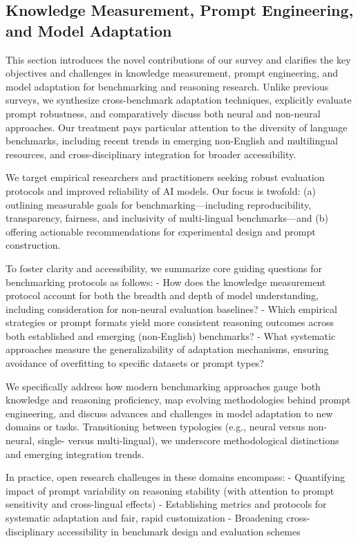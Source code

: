 \documentclass[sigconf]{acmart}
\begin{document}
\subsection{Knowledge Measurement, Prompt Engineering, and Model Adaptation}

This section introduces the novel contributions of our survey and clarifies the key objectives and challenges in knowledge measurement, prompt engineering, and model adaptation for benchmarking and reasoning research. Unlike previous surveys, we synthesize cross-benchmark adaptation techniques, explicitly evaluate prompt robustness, and comparatively discuss both neural and non-neural approaches. Our treatment pays particular attention to the diversity of language benchmarks, including recent trends in emerging non-English and multilingual resources, and cross-disciplinary integration for broader accessibility.

We target empirical researchers and practitioners seeking robust evaluation protocols and improved reliability of AI models. Our focus is twofold: (a) outlining measurable goals for benchmarking—including reproducibility, transparency, fairness, and inclusivity of multi-lingual benchmarks—and (b) offering actionable recommendations for experimental design and prompt construction. 

To foster clarity and accessibility, we summarize core guiding questions for benchmarking protocols as follows:
- How does the knowledge measurement protocol account for both the breadth and depth of model understanding, including consideration for non-neural evaluation baselines?
- Which empirical strategies or prompt formats yield more consistent reasoning outcomes across both established and emerging (non-English) benchmarks?
- What systematic approaches measure the generalizability of adaptation mechanisms, ensuring avoidance of overfitting to specific datasets or prompt types?

We specifically address how modern benchmarking approaches gauge both knowledge and reasoning proficiency, map evolving methodologies behind prompt engineering, and discuss advances and challenges in model adaptation to new domains or tasks. Transitioning between typologies (e.g., neural versus non-neural, single- versus multi-lingual), we underscore methodological distinctions and emerging integration trends.

In practice, open research challenges in these domains encompass:
- Quantifying impact of prompt variability on reasoning stability (with attention to prompt sensitivity and cross-lingual effects)
- Establishing metrics and protocols for systematic adaptation and fair, rapid customization
- Broadening cross-disciplinary accessibility in benchmark design and evaluation schemes
\end{document}
